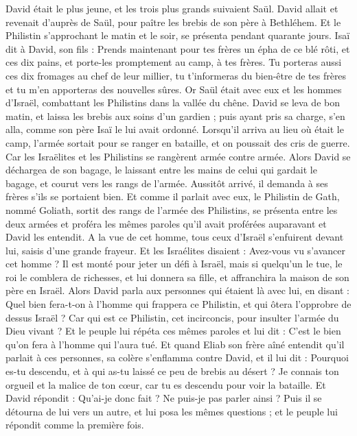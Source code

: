 \begin{multicols}{2}
David était le plus jeune, et les trois plus grands suivaient Saül.
David allait et revenait d'auprès de Saül, pour paître les brebis de son père à Bethléhem.
Et le Philistin s'approchant le matin et le soir, se présenta pendant quarante jours.
Isaï dit à David, son fils : Prends maintenant pour tes frères un épha de ce blé rôti, et ces dix pains, et porte-les promptement au camp, à tes frères.
Tu porteras aussi ces dix fromages au chef de leur millier, tu t’informeras du bien-être de tes frères et tu m'en apporteras des nouvelles sûres.
Or Saül était avec eux et les hommes d'Israël, combattant les Philistins dans la vallée du chêne.
David se leva de bon matin, et laissa les brebis aux soins d’un gardien ; puis ayant pris sa charge, s'en alla, comme son père Isaï le lui avait ordonné. Lorsqu’il arriva au lieu où était le camp, l'armée sortait pour se ranger en bataille, et on poussait des cris de guerre.
Car les Israëlites et les Philistins se rangèrent armée contre armée.
Alors David se déchargea de son bagage, le laissant entre les mains de celui qui gardait le bagage, et courut vers les rangs de l’armée. Aussitôt arrivé, il demanda à ses frères s'ils se portaient bien.
Et comme il parlait avec eux, le Philistin de Gath, nommé Goliath, sortit des rangs de l'armée des Philistins, se présenta entre les deux armées et proféra les mêmes paroles qu'il avait proférées auparavant et David les entendit.
A la vue de cet homme, tous ceux d'Israël s'enfuirent devant lui, saisis d’une grande frayeur.
Et les Israélites disaient : Avez-vous vu s’avancer cet homme ? Il est monté pour jeter un défi à Israël, mais si quelqu'un le tue, le roi le comblera de richesses, et lui donnera sa fille, et affranchira la maison de son père en Israël.
Alors David parla aux personnes qui étaient là avec lui, en disant : Quel bien fera-t-on à l'homme qui frappera ce Philistin, et qui ôtera l'opprobre de dessus Israël ? Car qui est ce Philistin, cet incirconcis, pour insulter l’armée du Dieu vivant ?
Et le peuple lui répéta ces mêmes paroles et lui dit : C'est le bien qu'on fera à l'homme qui l'aura tué.
Et quand Eliab son frère aîné entendit qu'il parlait à ces personnes, sa colère s'enflamma contre David, et il lui dit : Pourquoi es-tu descendu, et à qui as-tu laissé ce peu de brebis au désert ? Je connais ton orgueil et la malice de ton cœur, car tu es descendu pour voir la bataille.
Et David répondit : Qu'ai-je donc fait ? Ne puis-je pas parler ainsi ?
Puis il se détourna de lui vers un autre, et lui posa les mêmes questions ; et le peuple lui répondit comme la première fois.

\end{multicols}

